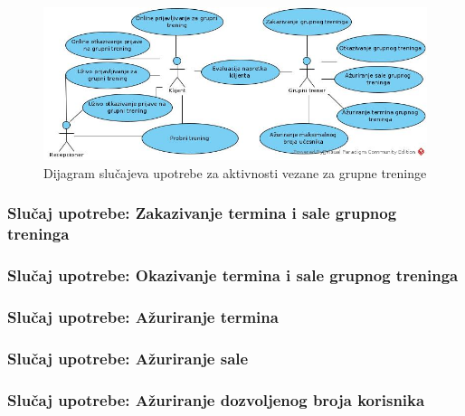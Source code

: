 \documentclass[../main.tex]{subfiles}
\begin{document}
\begin{figure}[!ht]
\begin{center}
\includegraphics[scale=0.55]{sections/images/dijagram_aktivnosti_grupnih_treninga.jpg}
\end{center}
\caption{Dijagram slučajeva upotrebe za aktivnosti vezane za grupne treninge}
\label{fig:kontekst}
\end{figure}

\newpage

\subsubsection{Slučaj upotrebe: Zakazivanje termina i sale grupnog treninga}


\subsubsection{Slučaj upotrebe: Okazivanje termina i sale grupnog treninga}


\subsubsection{Slučaj upotrebe: Ažuriranje termina}


\subsubsection{Slučaj upotrebe: Ažuriranje sale}


\subsubsection{Slučaj upotrebe: Ažuriranje dozvoljenog broja korisnika}

\end{document}
